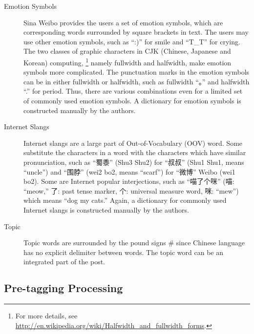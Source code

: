 \documentclass[11pt]{article}
\newcommand{\1}[1]{{\mathbf 1}\left\{#1\right\}}        %
\begin{document}
\begin{description}
\item[Emotion Symbols] Sina Weibo provides the users a set of emotion symbols, which are corresponding words surrounded by square brackets in text. The users may use other emotion symbols, such as ``:)'' for smile and ``T\_T'' for crying. 
The two classes of graphic characters in CJK (Chinese, Japanese and Korean) computing,
\footnote{For more details, see \url{http://en.wikipedia.org/wiki/Halfwidth_and_fullwidth_forms}.}
 namely fullwidth and halfwidth, make emotion symbols more complicated. The punctuation marks in the emotion symbols can be in either fullwidth or halfwidth, such as fullwidth ``。'' and halfwidth ``.'' for period. Thus, there are various combinations even for a limited set of commonly used emotion symbols. A dictionary for emotion symbols is constructed manually by the authors.
 
\item[Internet Slangs] 
Internet slangs are a large part of Out-of-Vocabulary (OOV) word. Some substitute the characters in a word with the characters which have similar pronunciation, such as ``蜀黍'' (Shu3 Shu2) for ``叔叔'' (Shu1 Shu1, means ``uncle'') and ``围脖'' (wei2 bo2, means ``scarf'') for ``微博'' Weibo (wei1 bo2). Some are Internet popular interjections, such as ``喵了个咪'' (喵: ``meow,'' 了: past tense marker, 个: universal measure word, 咪: ``mew'') which means ``dog my cats.'' Again, a dictionary for commonly used Internet slangs is constructed manually by the authors.


\item[Topic] Topic words are surrounded by the pound signs {\ttfamily \#} since Chinese language has no explicit delimiter between words. The topic word can be an integrated part of the post. 

\end{description}

 




\subsection{Pre-tagging Processing}
\end{document}
